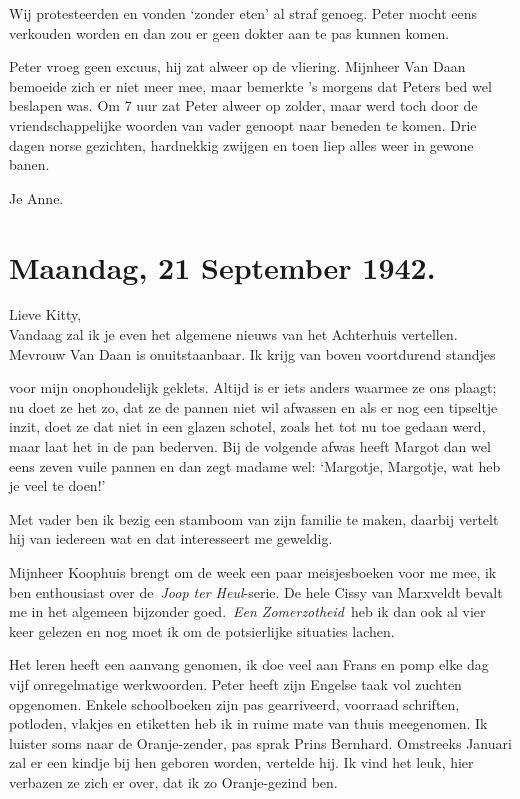\documentclass{book}
\begin{document}
Wij protesteerden en vonden `zonder eten' al straf genoeg. Peter mocht
eens verkouden worden en dan zou er geen dokter aan te pas kunnen komen.

Peter vroeg geen excuus, hij zat alweer op de vliering. Mijnheer Van
Daan bemoeide zich er niet meer mee, maar bemerkte 's morgens dat Peters
bed wel beslapen was. Om 7 uur zat Peter alweer op zolder, maar werd
toch door de vriendschappelijke woorden van vader genoopt naar beneden
te komen. Drie dagen norse gezichten, hardnekkig zwijgen en toen liep
alles weer in gewone banen.

Je Anne.

\chapter{Maandag, 21 September 1942.}

Lieve Kitty,\\Vandaag zal ik je even het algemene nieuws van het
Achterhuis vertellen. Mevrouw Van Daan is onuitstaanbaar. Ik krijg van
boven voortdurend standjes

voor mijn onophoudelijk geklets. Altijd is er iets anders waarmee ze ons
plaagt; nu doet ze het zo, dat ze de pannen niet wil afwassen en als er
nog een tipseltje inzit, doet ze dat niet in een glazen schotel, zoals
het tot nu toe gedaan werd, maar laat het in de pan bederven. Bij de
volgende afwas heeft Margot dan wel eens zeven vuile pannen en dan zegt
madame wel: `Margotje, Margotje, wat heb je veel te doen!'

Met vader ben ik bezig een stamboom van zijn familie te maken, daarbij
vertelt hij van iedereen wat en dat interesseert me geweldig.

Mijnheer Koophuis brengt om de week een paar meisjesboeken voor me mee,
ik ben enthousiast over de~\emph{Joop ter Heul}-serie. De hele Cissy van
Marxveldt bevalt me in het algemeen bijzonder goed.~\emph{Een
Zomerzotheid}~heb ik dan ook al vier keer gelezen en nog moet ik om de
potsierlijke situaties lachen.

Het leren heeft een aanvang genomen, ik doe veel aan Frans en pomp elke
dag vijf onregelmatige werkwoorden. Peter heeft zijn Engelse taak vol
zuchten opgenomen. Enkele schoolboeken zijn pas gearriveerd, voorraad
schriften, potloden, vlakjes en etiketten heb ik in ruime mate van thuis
meegenomen. Ik luister soms naar de Oranje-zender, pas sprak Prins
Bernhard. Omstreeks Januari zal er een kindje bij hen geboren worden,
vertelde hij. Ik vind het leuk, hier verbazen ze zich er over, dat ik zo
Oranje-gezind ben.
\end{document}
